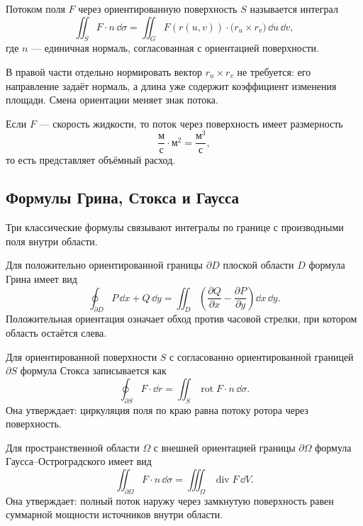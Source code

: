 \begin{definition}
Потоком поля $F$ через ориентированную поверхность $S$ называется интеграл
\begin{equation}
\label{eq:surface-flux-parametric}
\iint_S F\cdot n\,\dd\sigma
=
\iint_G
F(r(u,v))\cdot
\bigl(r_u\times r_v\bigr)
\,\dd u\,\dd v,
\end{equation}
где $n$ --- единичная нормаль, согласованная с ориентацией поверхности.
\end{definition}

В правой части отдельно нормировать вектор $r_u\times r_v$ не требуется: его направление задаёт нормаль, а длина уже содержит коэффициент изменения площади. Смена ориентации меняет знак потока.

Если $F$ --- скорость жидкости, то поток через поверхность имеет размерность
\[
\frac{\text{м}}{\text{с}}\cdot\text{м}^2
=
\frac{\text{м}^3}{\text{с}},
\]
то есть представляет объёмный расход.

\subsection{Формулы Грина, Стокса и Гаусса}

Три классические формулы связывают интегралы по границе с производными поля внутри области.

Для положительно ориентированной границы $\partial D$ плоской области $D$ формула Грина имеет вид
\begin{equation}
\label{eq:green-theorem}
\oint_{\partial D}
P\,\dd x+Q\,\dd y
=
\iint_D
\left(
\frac{\partial Q}{\partial x}
-
\frac{\partial P}{\partial y}
\right)
\dd x\,\dd y.
\end{equation}
Положительная ориентация означает обход против часовой стрелки, при котором область остаётся слева.

Для ориентированной поверхности $S$ с согласованно ориентированной границей $\partial S$ формула Стокса записывается как
\begin{equation}
\label{eq:stokes-vector}
\oint_{\partial S}F\cdot\dd r
=
\iint_S
\operatorname{rot}F\cdot n\,\dd\sigma.
\end{equation}
Она утверждает: циркуляция поля по краю равна потоку ротора через поверхность.

Для пространственной области $\Omega$ с внешней ориентацией границы $\partial\Omega$ формула Гаусса--Остроградского имеет вид
\begin{equation}
\label{eq:gauss-divergence}
\iint_{\partial\Omega}
F\cdot n\,\dd\sigma
=
\iiint_{\Omega}
\operatorname{div}F\,\dd V.
\end{equation}
Она утверждает: полный поток наружу через замкнутую поверхность равен суммарной мощности источников внутри области.

